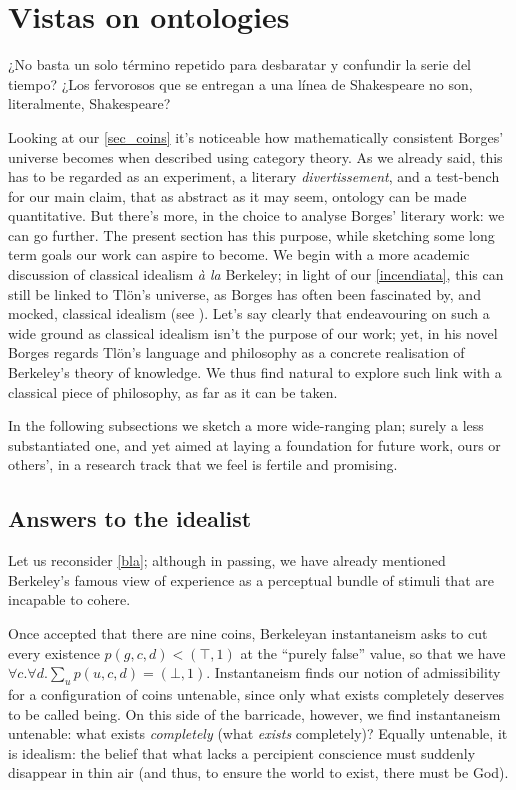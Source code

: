 \section{Vistas on ontologies}\label{vistas}
\epigraph{¿No basta un solo término repetido para desbaratar y confundir la serie del tiempo? ¿Los fervorosos que se entregan a una línea de Shakespeare no son, literalmente, Shakespeare?}{\cite{confutacion}}
Looking at our \autoref{sec_coins} it's noticeable how mathematically consistent Borges' universe becomes when described using category theory. As we already said, this has to be regarded as an experiment, a literary \emph{divertissement}, and a test-bench for our main claim, that as abstract as it may seem, ontology can be made quantitative. But there's more, in the choice to analyse Borges' literary work: we can go further. The present section has this purpose, while sketching some long term goals our work can aspire to become. We begin with a more academic discussion of classical idealism \emph{à la} Berkeley; in light of our \autoref{incendiata}, this can still be linked to Tl\"on's universe, as Borges has often been fascinated by, and mocked, classical idealism (see \cite{confutacion}). Let's say clearly that endeavouring on such a wide ground as classical idealism isn't the purpose of our work; yet, in his novel Borges regards Tl\"on's language and philosophy as a concrete realisation of Berkeley's theory of knowledge. We thus find natural to explore such link with a classical piece of philosophy, as far as it can be taken.

In the following subsections we sketch a more wide-ranging plan; surely a less substantiated one, and yet aimed at laying a foundation for future work, ours or others', in a research track that we feel is fertile and promising.
\subsection{Answers to the idealist}\label{berkelei}
Let us reconsider \autoref{bla}; although in passing, we have already mentioned Berkeley's famous view of experience as a perceptual bundle of stimuli that are incapable to cohere.

Once accepted that there are nine coins, Berkeleyan instantaneism asks to cut every existence $p(g,c,d) < (\top,1)$ at the ``purely false'' value, so that we have $\forall c.\forall d.\sum_u p(u,c,d) = (\bot,1)$. Instantaneism finds our notion of admissibility for a configuration of coins untenable, since only what exists completely deserves to be called being. On this side of the barricade, however, we find instantaneism untenable: what exists \emph{completely} (what \emph{exists} completely)? Equally untenable, it is idealism: the belief that what lacks a percipient conscience must suddenly disappear in thin air (and thus, to ensure the world to exist, there must be God).

